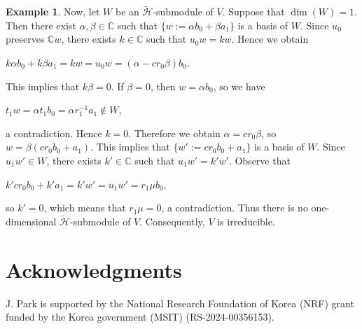 \documentclass[reqno]{amsart}
\newcommand{\acknowledgments}{\section*{Acknowledgments}}
\theoremstyle{definition}
\newtheorem{example}[theorem]{Example}
\begin{document}
\begin{example}
{Now, let $W$ be an $\widetilde{\mathcal{H}}$-submodule of $V$.
Suppose that $\dim(W) = 1$.
Then there exist $\alpha, \beta \in \mathbb{C}$ such that
$\{w := \alpha b_0 + \beta a_1\}$ is a basis of $W$.
Since $u_0$ preserves $\mathbb{C}w$,
there exists $k \in \mathbb{C}$ such that $u_0w = kw$.
Hence we obtain
\begin{center}
$k \alpha b_0 + k \beta a_1 =  kw = u_0w = (\alpha-cr_0 \beta) b_0$.
\end{center}
This implies that $k \beta = 0$.
If $\beta = 0$,
then $w = \alpha b_0$,
so we have
\begin{center}
$t_1w = \alpha t_1 b_0 = \alpha r_1^{-1} a_1 \notin W$,
\end{center}
a contradiction.
Hence $k = 0$.
Therefore we obtain $\alpha = c r_0 \beta$,
so $w = \beta(cr_0b_0 + a_1)$.
This implies that $\{w':= cr_0b_0 + a_1\}$ is a basis of $W$.
Since $u_1 w' \in W$,
there exists $k' \in \mathbb{C}$ such that $u_1w' = k'w'$.
Observe that
\begin{center}
$k'cr_0b_0 + k' a_1 = k'w' = u_1w' = r_1\mu b_0$,
\end{center}
so $k' = 0$,
which means that $r_1 \mu= 0$, a contradiction.
Thus there is no one-dimensional $\widetilde{\mathcal{H}}$-submodule of $V$.
Consequently, $V$ is irreducible.
}
%
\end{example}




\acknowledgments




J. Park is supported by the National Research Foundation of Korea (NRF) grant funded by the Korea government (MSIT) (RS-2024-00356153).
\end{document}
